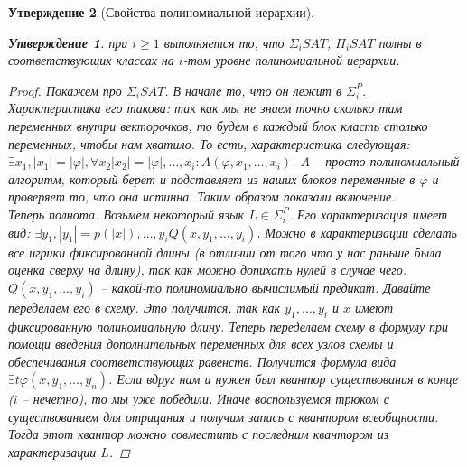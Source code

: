 \documentclass[12pt, letterpaper]{article}
\newtheorem{prop}{Утверждение}[section]
\newcommand{\ph}{\varphi}
\begin{document}
\begin{prop}[Свойства полиномиальной иерархии]
\begin{enumerate}
\begin{prop}
при $i\geq 1$ выполняется то, что 
$\Sigma_i SAT$, $\Pi_i SAT$ полны в соответствующих классах на $i$-том уровне полиномиальной иерархии.
\end{prop}
\begin{proof}
Покажем про $\Sigma_i SAT$. В начале то, что он лежит в $\Sigma_i^P$. Характеристика его такова: так как мы не знаем точно сколько там переменных внутри векторочков, то будем в каждый блок класть столько переменных, чтобы нам хватило. То есть, характеристика следующая: $\exists x_1, |x_1| = |\ph|, \forall x_2 |x_2| = |\ph|, \ldots, x_i : A(\ph, x_1, \ldots, x_i)$. $A$ -- просто полиномиальный алгоритм, который берет и подставляет из наших блоков переменные в $\ph$ и проверяет то, что она истинна. Таким образом показали включение.\\
Теперь полнота. Возьмем некоторый язык $L \in \Sigma^P_i$. Его характеризация имеет вид: $\exists y_1, |y_1| = p(|x|), \ldots, y_i Q(x, y_1, \ldots, y_i)$. Можно в характеризации сделать все игрики фиксированной длины (в отличии от того что у нас раньше была оценка сверху на длину), так как можно допихать нулей в случае чего. \\
$Q(x, y_1, \ldots, y_i)$ -- какой-то полиномиально вычислимый предикат. Давайте переделаем его в схему. Это получится, так как $y_1, \ldots, y_i$ и $x$ имеют фиксированную полиномиальную длину. Теперь переделаем схему в формулу при помощи введения дополнительных переменных для всех узлов схемы и обеспечивания соответствующих равенств. Получится формула вида $\exists t \ph(x, y_1, \ldots, y_n)$. Если вдруг нам и нужен был квантор существования в конце ($i$ -- нечетно), то мы уже победили. Иначе воспользуемся трюком с существованием для отрицания и получим запись с квантором всеобщности. Тогда этот квантор можно совместить с последним квантором из характеризации $L$. 

\end{proof}
\end{enumerate}
\end{prop}
\end{document}
